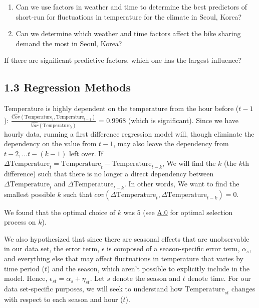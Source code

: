 \documentclass[
  letterpaper,
  DIV=11,
  numbers=noendperiod]{scrartcl}
\begin{document}
\begin{enumerate}
\def\labelenumi{\arabic{enumi}.}
\item
  Can we use factors in weather and time to determine the best
  predictors of short-run for fluctuations in temperature for the
  climate in Seoul, Korea?
\item
  Can we determine which weather and time factors affect the bike
  sharing demand the most in Seoul, Korea?
\end{enumerate}

If there are significant predictive factors, which one has the largest
influence?

\hypertarget{regression-methods}{%
\subsection{1.3 Regression Methods}\label{regression-methods}}

Temperature is highly dependent on the temperature from the hour before
(\(t-1\)):
\(\frac{\hat{\text{Cov}}(\text{Temperature}_t,\text{Temperature}_{t-1})}{\hat{Var}(\text{Temperature}_t)}\)
= 0.9968 (which is significant). Since we have hourly data, running a
first difference regression model will, though eliminate the dependency
on the value from \(t-1\), may also leave the dependency from
\(t-2,...t-(k-1)\) left over. If
\(\Delta\text{Temperature}_t = \text{Temperature}_t - \text{Temperature}_{t-k}\),
We will find the \(k\) (the \(k\)th difference) such that there is no
longer a direct dependency between \(\Delta\text{Temperature}_t\) and
\(\Delta\text{Temperature}_{t-k}\). In other words, We want to find the
smallest possible \(k\) such that
\(cov(\Delta\text{Temperature}_t, \Delta\text{Temperature}_{t-k}) = 0\).

We found that the optimal choice of \(k\) was \(5\) (see
\protect\hyperlink{a0}{A.0} for optimal selection process on \(k\)).

We also hypothesized that since there are seasonal effects that are
unobservable in our data set, the error term, \(\epsilon\) is composed
of a season-specific error term, \(\alpha_{s}\), and everything else
that may affect fluctuations in temperature that varies by time period
(\(t\)) and the season, which aren't possible to explicitly include in
the model. Hence, \(\epsilon_{st} = \alpha_{s} + \eta_{st}\). Let \(s\)
denote the season and \(t\) denote time. For our data set-specific
purposes, we will seek to understand how \(\text{Temperature}_{st}\)
changes with respect to each season and hour (\(t\)).
\end{document}
